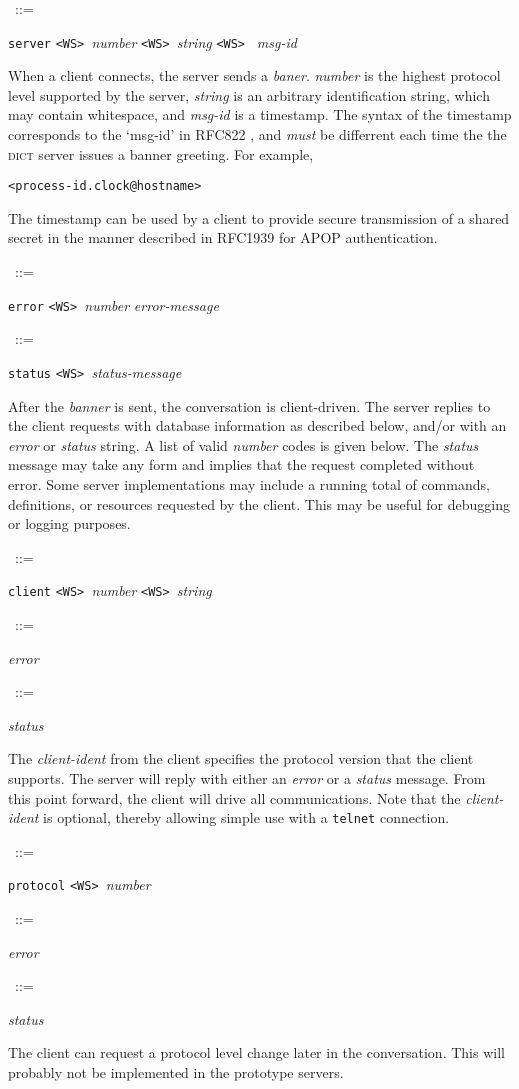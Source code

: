 \documentclass{article}
\newcommand{\WS}{\mbox{\tt <WS>\ }}
\newcommand{\note}{\bigskip\par\noindent}
\newcommand{\prd}[3][]{\noindent\begin{leftline}\hspace{1em}{\it #2}\ ::=\ %
  \begin{minipage}[t]{.64\textwidth}\raggedright #3\end{minipage}%
    \ifthenelse{\equal{#1}{}}{}%
    {\begin{minipage}[t]{.54\textwidth}\raggedright #1\end{minipage}%
      \vspace{1ex}}%
    \end{leftline}}
\newcommand{\lhs}[1]{{\it #1\/}}
\newcommand{\lit}[1]{{\tt #1}}
\newcommand{\dict}{\textsc{dict}\xspace}
\begin{document}
\prd{banner}{\lit{server} \WS \lhs{number} \WS \lhs{string} \WS
  \lhs{msg-id}}

\note When a client connects, the server sends a \lhs{baner}.  \lhs{number}
is the highest protocol level supported by the server, \lhs{string} is an
arbitrary identification string, which may contain whitespace, and
\lhs{msg-id} is a timestamp.  The syntax of the timestamp corresponds to
the `msg-id' in RFC822 \cite{RFC822}, and \emph{must} be differrent each
time the the \dict server issues a banner greeting.  For example,
\begin{center}
\begin{verbatim}
<process-id.clock@hostname>
\end{verbatim}
\end{center}
The timestamp can be used by a client to provide secure transmission of a
shared secret in the manner described in RFC1939 \cite{RFC1939} for APOP
authentication.\note

\prd{error}{\lit{error} \WS \lhs{number} \lhs{error-message}}
\prd{status}{\lit{status} \WS \lhs{status-message}}

\note After the \lhs{banner} is sent, the conversation is client-driven.
The server replies to the client requests with database information as
described below, and/or with an \lhs{error} or \lhs{status} string.  A list
of valid \lhs{number} codes is given below.  The \lhs{status} message may
take any form and implies that the request completed without error.  Some
server implementations may include a running total of commands,
definitions, or resources requested by the client.  This may be useful for
debugging or logging purposes.\note

\prd{ident}{\lit{client} \WS \lhs{number} \WS \lhs{string}}
\prd{ident-response}{\lhs{error}}
\prd{ident-response}{\lhs{status}}

\note The \lhs{client-ident} from the client specifies the protocol version
that the client supports.  The server will reply with either an \lhs{error}
or a \lhs{status} message.  From this point forward, the client will drive
all communications.  Note that the \lhs{client-ident} is optional, thereby
allowing simple use with a \texttt{telnet} connection.\note

\prd{protocol}{\lit{protocol} \WS \lhs{number}}
\prd{protocol-response}{\lhs{error}}
\prd{protocol-response}{\lhs{status}}

\note The client can request a protocol level change later in the
conversation.  This will probably not be implemented in the prototype
servers.\note
\end{document}

